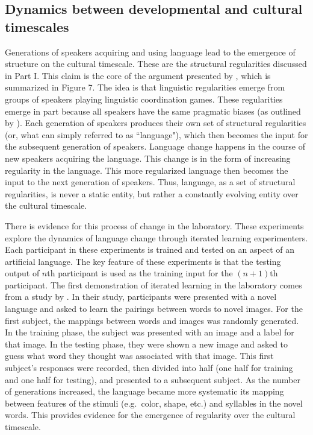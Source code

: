 \documentclass[man, noapacite, 12pt]{apa2}
\begin{document}
\subsection{Dynamics between developmental and cultural timescales}

Generations of speakers acquiring and using language lead to the emergence of structure on the cultural timescale. These are the structural regularities discussed in Part I. This claim is the core of the argument presented by , which is summarized in Figure 7. The idea is that linguistic regularities emerge from groups of speakers playing linguistic coordination games. These regularities emerge in part because all speakers have the same pragmatic biases (as outlined by ). Each generation of speakers produces their own set of structural regularities (or, what can simply referred to as ``language"), which then becomes the input for the subsequent generation of speakers. Language change happens in the course of new speakers acquiring the language. This change is in the form of increasing regularity in the language. This more regularized language then becomes the input to the next generation of speakers. Thus, language, as a set of structural regularities,  is never a static entity, but rather a constantly evolving entity over the cultural timescale. 

There is evidence for this process of change in the laboratory. These experiments explore the dynamics of language change through iterated learning experimenters. Each participant in these experiments is trained and tested on an aspect of an artificial language. The key feature of these experiments is that the testing output of $n$th participant is used as the training input for the $(n+1)$th participant. The first  demonstration of iterated learning in the laboratory comes from  a study by . In their study, participants were presented with a novel language and asked to learn the pairings between words to novel images. For the first subject, the mappings between words and images was randomly generated. In the training phase, the subject was presented with an image and a label for that image. In the testing phase, they were shown a new image and asked to guess what word they thought was associated with that image. This first subject's responses were recorded, then divided into half (one half for training and one half for testing), and presented to a subsequent subject.  As the number of generations increased, the language became more systematic its mapping between features of the stimuli (e.g.\ color, shape, etc.) and syllables in the novel words. This provides evidence for the emergence of regularity over the cultural timescale.
\end{document}

